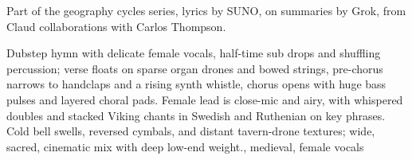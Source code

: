 
\begin{notes}
Part of the geography cycles series, lyrics by SUNO, on summaries by Grok, from Claud collaborations with Carlos Thompson.
\end{notes}
\begin{style}
Dubstep hymn with delicate female vocals, half-time sub drops and shuffling percussion; verse floats on sparse organ drones and bowed strings, pre-chorus narrows to handclaps and a rising synth whistle, chorus opens with huge bass pulses and layered choral pads. Female lead is close-mic and airy, with whispered doubles and stacked Viking chants in Swedish and Ruthenian on key phrases. Cold bell swells, reversed cymbals, and distant tavern-drone textures; wide, sacred, cinematic mix with deep low-end weight., medieval, female vocals
\end{style}
